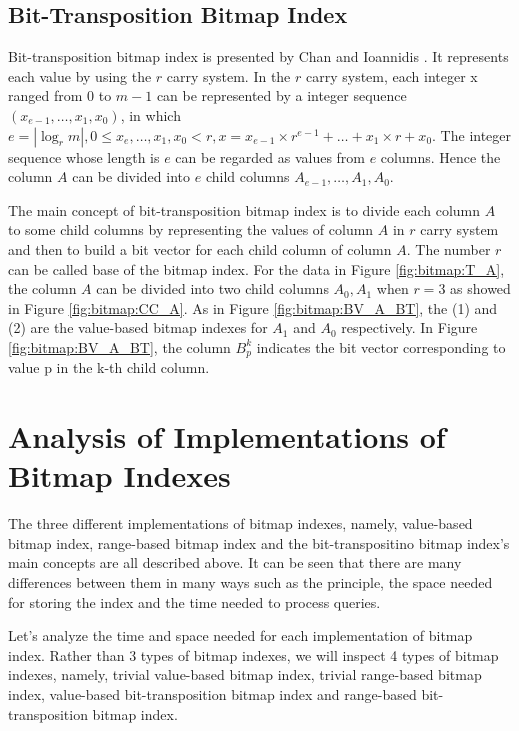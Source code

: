 \documentclass[12pt, a4paper]{article}
\begin{document}
\subsection{Bit-Transposition Bitmap Index}

Bit-transposition bitmap index is presented by Chan and Ioannidis \citep{Wong1986}. It represents each value by using the $r$ carry system. In the $r$ carry system, each integer x ranged from $0$ to $m-1$ can be represented by a integer sequence $(x_{e-1},\ldots,x_1,x_0)$, in which $e=|\log_r{m}|, 0 \leq x_e, \ldots, x_1, x_0 < r, x=x_{e-1} \times r^{e-1} + \ldots + x_1 \times r + x_0$. The integer sequence whose length is $e$ can be regarded as values from $e$ columns. Hence the column $A$ can be divided into $e$ child columns $A_{e-1}, \ldots, A_1, A_0$.

The main concept of bit-transposition bitmap index is to divide each column $A$ to some child columns by representing the values of column $A$ in $r$ carry system and then to build a bit vector for each child column of column $A$. The number $r$ can be called base of the bitmap index. For the data in Figure \ref{fig:bitmap:T_A}, the column $A$ can be divided into two child columns $A_0,A_1$ when $r=3$ as showed in Figure \ref{fig:bitmap:CC_A}. As in Figure \ref{fig:bitmap:BV_A_BT}, the (1) and (2) are the value-based bitmap indexes for $A_1$ and $A_0$ respectively. In Figure \ref{fig:bitmap:BV_A_BT}, the column $B_p^k$ indicates the bit vector corresponding to value p in the k-th child column.

\section{Analysis of Implementations of Bitmap Indexes}\label{sec:analyze}

The three different implementations of bitmap indexes, namely, value-based bitmap index, range-based bitmap index and the bit-transpositino bitmap index's main concepts are all described above. It can be seen that there are many differences between them in many ways such as the principle, the space needed for storing the index and the time needed to process queries.

Let's analyze the time and space needed for each implementation of bitmap index. Rather than 3 types of bitmap indexes, we will inspect 4 types of bitmap indexes, namely, trivial value-based bitmap index, trivial range-based bitmap index, value-based bit-transposition bitmap index and range-based bit-transposition bitmap index.
\end{document}
